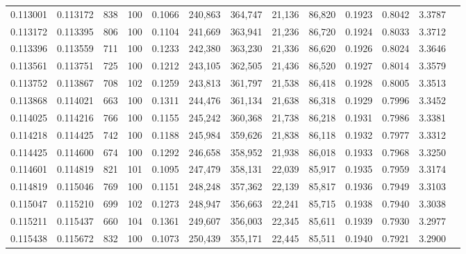 \begin{tabular}{rrrrrrrrrrrrr}
0.113001 & 0.113172 &   838 & 100 &                                     0.1066 & 240,863 & 364,747 &  21,136 &  86,820 & 0.1923 & 0.8042 & 3.3787 \\
0.113172 & 0.113395 &   806 & 100 &                                     0.1104 & 241,669 & 363,941 &  21,236 &  86,720 & 0.1924 & 0.8033 & 3.3712 \\
0.113396 & 0.113559 &   711 & 100 &                                     0.1233 & 242,380 & 363,230 &  21,336 &  86,620 & 0.1926 & 0.8024 & 3.3646 \\
0.113561 & 0.113751 &   725 & 100 &                                     0.1212 & 243,105 & 362,505 &  21,436 &  86,520 & 0.1927 & 0.8014 & 3.3579 \\
0.113752 & 0.113867 &   708 & 102 &                                     0.1259 & 243,813 & 361,797 &  21,538 &  86,418 & 0.1928 & 0.8005 & 3.3513 \\
0.113868 & 0.114021 &   663 & 100 &                                     0.1311 & 244,476 & 361,134 &  21,638 &  86,318 & 0.1929 & 0.7996 & 3.3452 \\
0.114025 & 0.114216 &   766 & 100 &                                     0.1155 & 245,242 & 360,368 &  21,738 &  86,218 & 0.1931 & 0.7986 & 3.3381 \\
0.114218 & 0.114425 &   742 & 100 &                                     0.1188 & 245,984 & 359,626 &  21,838 &  86,118 & 0.1932 & 0.7977 & 3.3312 \\
0.114425 & 0.114600 &   674 & 100 &                                     0.1292 & 246,658 & 358,952 &  21,938 &  86,018 & 0.1933 & 0.7968 & 3.3250 \\
0.114601 & 0.114819 &   821 & 101 &                                     0.1095 & 247,479 & 358,131 &  22,039 &  85,917 & 0.1935 & 0.7959 & 3.3174 \\
0.114819 & 0.115046 &   769 & 100 &                                     0.1151 & 248,248 & 357,362 &  22,139 &  85,817 & 0.1936 & 0.7949 & 3.3103 \\
0.115047 & 0.115210 &   699 & 102 &                                     0.1273 & 248,947 & 356,663 &  22,241 &  85,715 & 0.1938 & 0.7940 & 3.3038 \\
0.115211 & 0.115437 &   660 & 104 &                                     0.1361 & 249,607 & 356,003 &  22,345 &  85,611 & 0.1939 & 0.7930 & 3.2977 \\
0.115438 & 0.115672 &   832 & 100 &                                     0.1073 & 250,439 & 355,171 &  22,445 &  85,511 & 0.1940 & 0.7921 & 3.2900 \\

\end{tabular}

